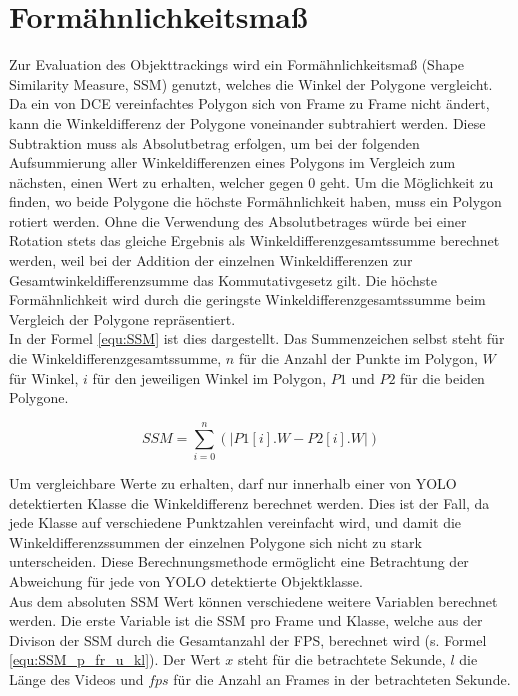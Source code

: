 \section{Formähnlichkeitsmaß }{ \label{theo:SSM}
	Zur Evaluation des Objekttrackings wird ein Formähnlichkeitsmaß (\glqq Shape Similarity Measure\grqq{}, SSM) genutzt, welches die Winkel der Polygone vergleicht. \\
	Da ein von DCE vereinfachtes Polygon sich von Frame zu Frame nicht ändert, kann die Winkeldifferenz der Polygone voneinander subtrahiert werden. Diese Subtraktion muss als Absolutbetrag erfolgen, um bei der folgenden Aufsummierung aller Winkeldifferenzen eines Polygons im Vergleich zum nächsten, einen Wert zu erhalten, welcher gegen 0 geht. Um die Möglichkeit zu finden, wo beide Polygone die höchste Formähnlichkeit haben, muss ein Polygon rotiert werden. Ohne die Verwendung des Absolutbetrages würde bei einer Rotation stets das gleiche Ergebnis als Winkeldifferenzgesamtssumme berechnet werden, weil bei der Addition der einzelnen Winkeldifferenzen zur Gesamtwinkeldifferenzsumme das Kommutativgesetz gilt. Die höchste Formähnlichkeit wird durch die geringste Winkeldifferenzgesamtssumme beim Vergleich der Polygone repräsentiert.\\
	In der Formel \ref{equ:SSM} ist dies dargestellt. Das Summenzeichen selbst steht für die Winkeldifferenzgesamtssumme, $n$ für die Anzahl der Punkte im Polygon, $W$ für Winkel, $i$ für den jeweiligen Winkel im Polygon, $P1$ und $P2$ für die beiden Polygone.

	\begin{equation} \label{equ:SSM}
		SSM = \sum_{i = 0}^{n}  (\lvert P1[i].W - P2[i].W \rvert)
	\end{equation}	

	Um vergleichbare Werte zu erhalten, darf nur innerhalb einer von YOLO detektierten Klasse die Winkeldifferenz berechnet werden. Dies ist der Fall, da jede Klasse auf verschiedene Punktzahlen vereinfacht wird, und damit die Winkeldifferenzssummen der einzelnen Polygone sich nicht zu stark unterscheiden. Diese Berechnungsmethode ermöglicht eine Betrachtung der Abweichung für jede von YOLO detektierte Objektklasse. \\
	Aus dem absoluten SSM Wert können verschiedene weitere Variablen berechnet werden. Die erste Variable ist die SSM pro Frame und Klasse, welche aus der Divison der SSM durch die Gesamtanzahl der FPS, berechnet wird (s. Formel \ref{equ:SSM_p_fr_u_kl}). Der Wert $x$ steht für die betrachtete Sekunde, $l$ die Länge des Videos und $\textit{fps}$ für die Anzahl an Frames in der betrachteten Sekunde.
 
}
